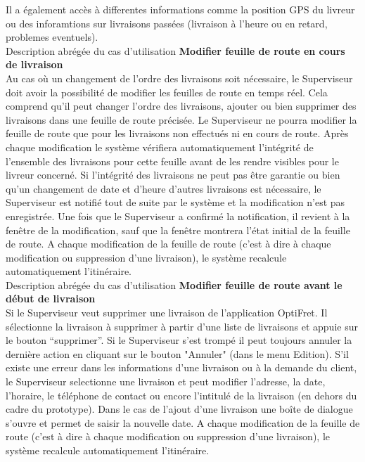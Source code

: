 \documentclass[a4paper]{report}
\begin{document}
Il a également accès à differentes informations comme la position GPS du
livreur ou des inforamtions sur livraisons passées (livraison à l’heure ou en
retard, problemes eventuels).
\\

Description abrégée du cas d’utilisation \textbf{Modifier feuille de route en
    cours de livraison}\\

Au cas où un changement de l’ordre des livraisons soit nécessaire, le
Superviseur doit avoir la possibilité de modifier les feuilles de route en
temps réel. Cela comprend qu’il peut changer l’ordre des livraisons, ajouter ou
bien supprimer des livraisons dans une feuille de route précisée. Le
Superviseur ne pourra modifier la feuille de route que pour les livraisons non
effectués ni en cours de route. Après chaque modification le système vérifiera
automatiquement l’intégrité de l’ensemble des livraisons pour cette feuille
avant de les rendre visibles pour le livreur concerné. 
Si l’intégrité des livraisons ne peut pas être garantie ou bien qu’un
changement de date et d’heure d’autres livraisons est nécessaire, le
Superviseur est notifié tout de suite par le système et la modification n’est
pas enregistrée. Une fois que le Superviseur a confirmé la notification, il
revient à la fenêtre de la modification, sauf que la fenêtre montrera l’état
initial de la feuille de route.  A chaque modification de la feuille de route
(c’est à dire à chaque modification ou suppression d’une livraison), le système
recalcule automatiquement l’itinéraire.\\

Description abrégée du cas d’utilisation \textbf{Modifier feuille de route
    avant le début de livraison}\\

Si le Superviseur veut supprimer une livraison de l’application OptiFret. Il
sélectionne la livraison à supprimer à partir d’une liste de livraisons et
appuie sur le bouton “supprimer”. Si le Superviseur s'est trompé il peut
toujours annuler la dernière action en cliquant sur le bouton "Annuler" (dans
le menu Edition).  S’il existe une erreur dans les informations d’une livraison
ou à la demande du client, le Superviseur selectionne une livraison et peut
modifier l’adresse, la date, l’horaire, le téléphone de contact ou encore
l’intitulé de la livraison (en dehors du cadre du prototype). Dans le cas de
l'ajout d'une livraison une boîte de dialogue s'ouvre et permet de saisir la
nouvelle date.  A chaque modification de la feuille de route (c’est à dire à
chaque modification ou suppression d’une livraison), le système recalcule
automatiquement l’itinéraire.\\
\end{document}
